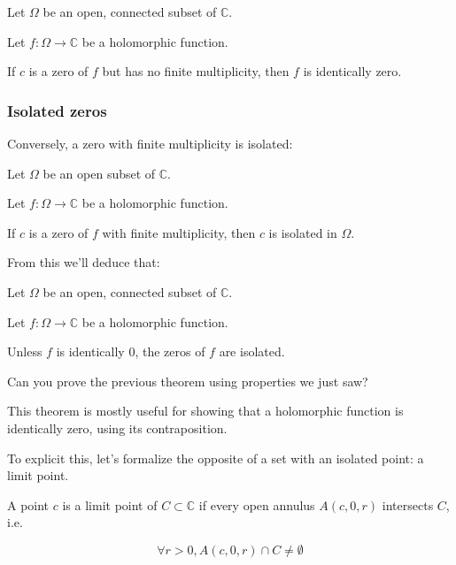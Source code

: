 \begin{thm*}
    Let $\Omega$ be an open, connected subset of $\mathbb{C}$.

    Let $f: \Omega \rightarrow \mathbb{C}$ be a holomorphic function.

    If $c$ is a zero of $f$ but has no finite multiplicity, then $f$ is identically zero.
\end{thm*}

\subsubsection{Isolated zeros}

Conversely, a zero with finite multiplicity is isolated:

\begin{thm*}

    Let $\Omega$ be an open subset of $\mathbb{C}$.

    Let $f: \Omega \rightarrow \mathbb{C}$ be a holomorphic function.

    If $c$ is a zero of $f$ with finite multiplicity, then $c$ is isolated in $\Omega$.
\end{thm*}

From this we'll deduce that:

\begin{thm*}
    Let $\Omega$ be an open, connected subset of $\mathbb{C}$.

    Let $f: \Omega \rightarrow \mathbb{C}$ be a holomorphic function.
    
    Unless $f$ is identically 0, the zeros of $f$ are isolated.
\end{thm*}

\begin{exo}
    Can you prove the previous theorem using properties we just saw?
\end{exo}

\begin{note}
    [In practice]
    
    This theorem is mostly useful for showing that a holomorphic function is identically zero, using its contraposition.
\end{note}

To explicit this, let's formalize the opposite of a set with an isolated point: a limit point.

\begin{defi}
    A point $c$ is a limit point of $C\subset \mathbb{C}$ if every open annulus $A(c, 0, r)$ intersects $C$, i.e.

    $$ \forall r > 0, A(c, 0, r) \cap C \neq \emptyset $$
\end{defi}

